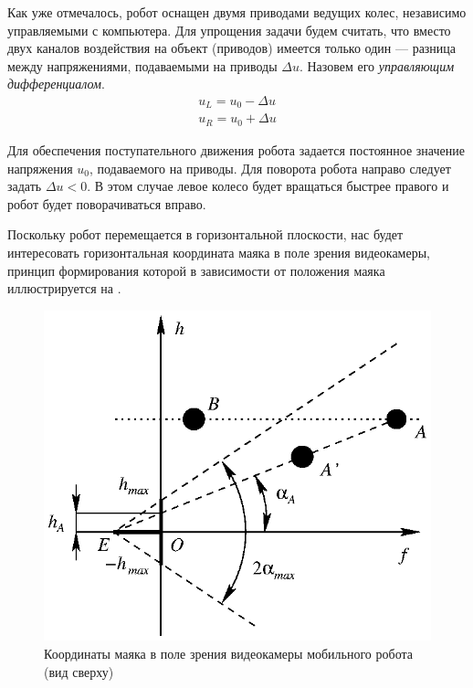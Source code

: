 Как уже отмечалось, робот оснащен двумя приводами ведущих колес,
независимо управляемыми с компьютера.  Для упрощения задачи будем
считать, что вместо двух каналов воздействия на объект (приводов)
имеется только один --- разница между напряжениями, подаваемыми на
приводы $\Delta u$.  Назовем его {\it управляющим дифференциалом}.
$$\begin{array}{l}
u_L=u_0-\Delta u\\
u_R=u_0+\Delta u
\end{array}$$

Для обеспечения поступательного движения робота задается постоянное
значение напряжения $u_0$, подаваемого на приводы.  Для поворота
робота направо следует задать $\Delta u<0$.  В этом случае левое
колесо будет вращаться быстрее правого и робот будет поворачиваться
вправо.


Поскольку робот перемещается в горизонтальной плоскости, нас будет
интересовать горизонтальная координата маяка в поле зрения
видеокамеры, принцип формирования которой в зависимости от положения
маяка иллюстрируется на .
\begin{figure}
\centerline{\includegraphics{moby_eye_coord_h}}
\caption{Координаты маяка в поле зрения видеокамеры мобильного робота
         (вид сверху)}
\label{fig:moby_eye_coord}
\end{figure}

